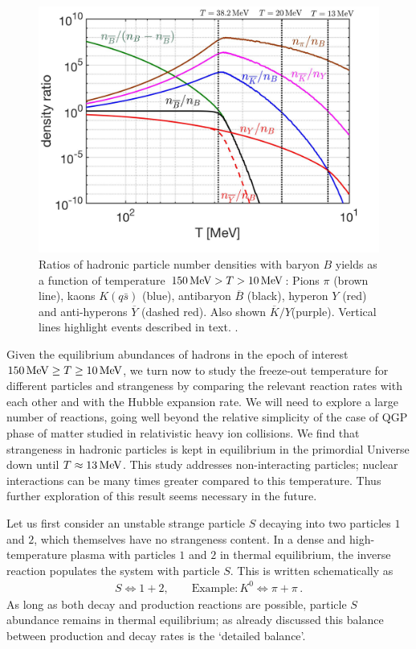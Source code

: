\begin{figure} 
\centerline{
\includegraphics[width=0.8\linewidth]{./plots/Meson_Baryon_density_ratio_C.jpg}}
\caption{Ratios of hadronic particle number densities with baryon $B$ yields as a function of temperature $150\text{\,MeV}> T>10\text{\,MeV}$: Pions $\pi$ (brown line), kaons $K( q\bar s)$ (blue), antibaryon $\overline B$ (black), hyperon $Y$ (red) and anti-hyperons $\overline Y$ (dashed red). Also shown $\overline K/Y$(purple). Vertical lines highlight events described in text.  
. }
\label{EquilibPartRatiosFig} 
\end{figure}

Given the equilibrium abundances of hadrons in the epoch of interest $150\text{\,MeV}\ge T\ge 10\text{\,MeV}$, we turn now to study the freeze-out temperature for different particles and strangeness by comparing the relevant reaction rates with each other and with the Hubble expansion rate. We will need to explore a large number of reactions, going well beyond the relative simplicity of the case of QGP phase of matter studied in relativistic heavy ion collisions. We find that strangeness in hadronic particles is kept in equilibrium in the primordial Universe down until $T\approx 13\text{\,MeV}$. This study addresses non-interacting particles; nuclear interactions can be many times greater compared to this temperature. Thus further exploration of this result seems necessary in the future.

Let us first consider an unstable strange particle $S$ decaying into two particles $1$ and $2$, which themselves have no strangeness content. In a dense and high-temperature plasma with particles $1$ and $2$ in thermal equilibrium, the inverse reaction populates the system with particle $S$. This is written schematically as
\begin{align}
 S\Longleftrightarrow1+2,\qquad \mathrm{Example}: K^0\Longleftrightarrow\pi+\pi\,.
\end{align}
As long as both decay and production reactions are possible, particle $S$ abundance remains in thermal equilibrium; as already discussed this balance between production and decay rates is the `detailed balance'.

